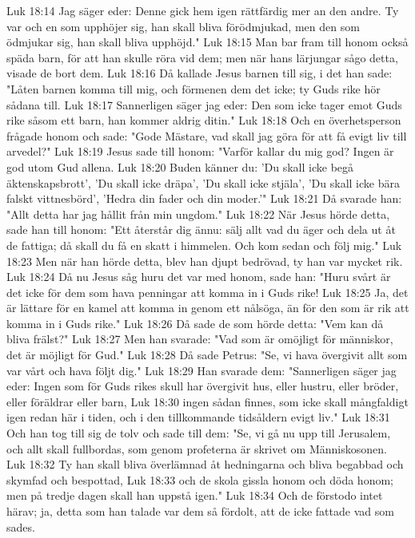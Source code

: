 Luk 18:14  Jag säger eder: Denne gick hem igen rättfärdig mer an den andre. Ty var och en som upphöjer sig, han skall bliva förödmjukad, men den som ödmjukar sig, han skall bliva upphöjd."
Luk 18:15  Man bar fram till honom också späda barn, för att han skulle röra vid dem; men när hans lärjungar sågo detta, visade de bort dem.
Luk 18:16  Då kallade Jesus barnen till sig, i det han sade: "Låten barnen komma till mig, och förmenen dem det icke; ty Guds rike hör sådana till.
Luk 18:17  Sannerligen säger jag eder: Den som icke tager emot Guds rike såsom ett barn, han kommer aldrig ditin."
Luk 18:18  Och en överhetsperson frågade honom och sade: "Gode Mästare, vad skall jag göra för att få evigt liv till arvedel?"
Luk 18:19  Jesus sade till honom: "Varför kallar du mig god? Ingen är god utom Gud allena.
Luk 18:20  Buden känner du: 'Du skall icke begå äktenskapsbrott', 'Du skall icke dräpa', 'Du skall icke stjäla', 'Du skall icke bära falskt vittnesbörd', 'Hedra din fader och din moder.'"
Luk 18:21  Då svarade han: "Allt detta har jag hållit från min ungdom."
Luk 18:22  När Jesus hörde detta, sade han till honom: "Ett återstår dig ännu: sälj allt vad du äger och dela ut åt de fattiga; då skall du få en skatt i himmelen. Och kom sedan och följ mig."
Luk 18:23  Men när han hörde detta, blev han djupt bedrövad, ty han var mycket rik.
Luk 18:24  Då nu Jesus såg huru det var med honom, sade han: "Huru svårt är det icke för dem som hava penningar att komma in i Guds rike!
Luk 18:25  Ja, det är lättare för en kamel att komma in genom ett nålsöga, än för den som är rik att komma in i Guds rike."
Luk 18:26  Då sade de som hörde detta: "Vem kan då bliva frälst?"
Luk 18:27  Men han svarade: "Vad som är omöjligt för människor, det är möjligt för Gud."
Luk 18:28  Då sade Petrus: "Se, vi hava övergivit allt som var vårt och hava följt dig."
Luk 18:29  Han svarade dem: "Sannerligen säger jag eder: Ingen som för Guds rikes skull har övergivit hus, eller hustru, eller bröder, eller föräldrar eller barn,
Luk 18:30  ingen sådan finnes, som icke skall mångfaldigt igen redan här i tiden, och i den tillkommande tidsåldern evigt liv."
Luk 18:31  Och han tog till sig de tolv och sade till dem: "Se, vi gå nu upp till Jerusalem, och allt skall fullbordas, som genom profeterna är skrivet om Människosonen.
Luk 18:32  Ty han skall bliva överlämnad åt hedningarna och bliva begabbad och skymfad och bespottad,
Luk 18:33  och de skola gissla honom och döda honom; men på tredje dagen skall han uppstå igen."
Luk 18:34  Och de förstodo intet härav; ja, detta som han talade var dem så fördolt, att de icke fattade vad som sades.
